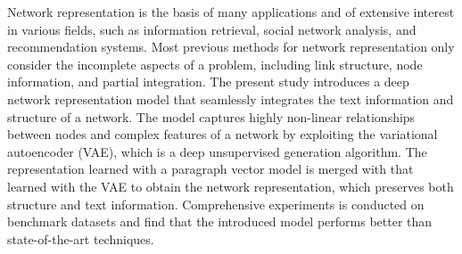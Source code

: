 Network representation is the basis of many applications and of extensive interest in various fields, such as information retrieval, social network analysis, and recommendation systems. Most previous methods for network representation only consider the incomplete aspects of a problem, including link structure, node information, and partial integration. The present study introduces a deep network representation model that seamlessly integrates the text information and structure of a network. The model captures highly non-linear relationships between nodes and complex features of a network by exploiting the variational autoencoder (VAE), which is a deep unsupervised generation algorithm. The representation learned with a paragraph vector model is merged with that learned with the VAE to obtain the network representation, which preserves both structure and text information. Comprehensive experiments is conducted on benchmark datasets and find that the introduced model performs better than state-of-the-art techniques.
